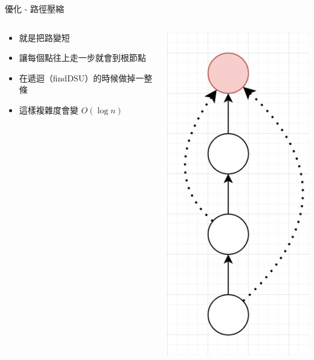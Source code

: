 \documentclass[aspectratio=169]{beamer}
\begin{document}
    \begin{frame}{優化 - 路徑壓縮}
        \begin{columns}
            \begin{column}{0.6\textwidth}
                \begin{itemize}
                    \item 就是把路變短
                    \item<2-> 讓每個點往上走一步就會到根節點
                    \item<2-> 在遞迴（findDSU）的時候做掉一整條
                    \item<2-> 這樣複雜度會變 $O(\log n)$
                \end{itemize}
            \end{column}
            \begin{column}{0.4\textwidth}
                \begin{center}
                     \includegraphics[scale=0.35]{images/path_compression.png}
                \end{center}
            \end{column}
        \end{columns}
    \end{frame}
\end{document}
